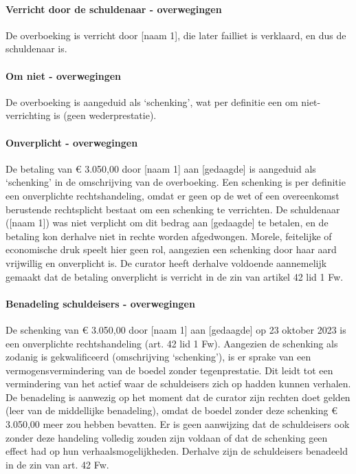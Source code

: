 \documentclass[
  dutch,
  a4paper,
]{article}
\begin{document}
\paragraph{Verricht door de schuldenaar - overwegingen}\label{verricht-door-de-schuldenaar---overwegingen-27}

De overboeking is verricht door {[}naam 1{]}, die later failliet is verklaard, en dus de schuldenaar is.

\paragraph{Om niet - overwegingen}\label{om-niet---overwegingen-27}

De overboeking is aangeduid als `schenking', wat per definitie een om niet-verrichting is (geen wederprestatie).

\paragraph{Onverplicht - overwegingen}\label{onverplicht---overwegingen-27}

De betaling van € 3.050,00 door {[}naam 1{]} aan {[}gedaagde{]} is aangeduid als `schenking' in de omschrijving van de overboeking. Een schenking is per definitie een onverplichte rechtshandeling, omdat er geen op de wet of een overeenkomst berustende rechtsplicht bestaat om een schenking te verrichten. De schuldenaar ({[}naam 1{]}) was niet verplicht om dit bedrag aan {[}gedaagde{]} te betalen, en de betaling kon derhalve niet in rechte worden afgedwongen. Morele, feitelijke of economische druk speelt hier geen rol, aangezien een schenking door haar aard vrijwillig en onverplicht is. De curator heeft derhalve voldoende aannemelijk gemaakt dat de betaling onverplicht is verricht in de zin van artikel 42 lid 1 Fw.

\paragraph{Benadeling schuldeisers - overwegingen}\label{benadeling-schuldeisers---overwegingen-27}

De schenking van € 3.050,00 door {[}naam 1{]} aan {[}gedaagde{]} op 23 oktober 2023 is een onverplichte rechtshandeling (art. 42 lid 1 Fw). Aangezien de schenking als zodanig is gekwalificeerd (omschrijving `schenking'), is er sprake van een vermogensvermindering van de boedel zonder tegenprestatie. Dit leidt tot een vermindering van het actief waar de schuldeisers zich op hadden kunnen verhalen. De benadeling is aanwezig op het moment dat de curator zijn rechten doet gelden (leer van de middellijke benadeling), omdat de boedel zonder deze schenking € 3.050,00 meer zou hebben bevatten. Er is geen aanwijzing dat de schuldeisers ook zonder deze handeling volledig zouden zijn voldaan of dat de schenking geen effect had op hun verhaalsmogelijkheden. Derhalve zijn de schuldeisers benadeeld in de zin van art. 42 Fw.
\end{document}
